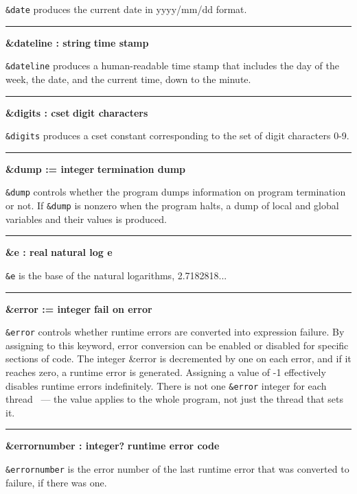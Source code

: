 \noindent
{}\texttt{\&date} produces the current
date in yyyy/mm/dd format.

\bigskip\hrule\vspace{0.1cm}
\noindent
{\bf \&dateline : string } \hfill {\bf time stamp}

\noindent
{}\texttt{\&dateline} produces a human-readable time
stamp that includes the day of the week, the date, and the current
time, down to the minute.

\bigskip\hrule\vspace{0.1cm}
\noindent
{\bf \&digits : cset } \hfill {\bf digit characters}

\noindent
{}\texttt{\&digits} produces a cset constant
corresponding to the set of digit characters 0-9.

\bigskip\hrule\vspace{0.1cm}
\noindent
{\bf \&dump := integer } \hfill {\bf termination dump}

\noindent
\texttt{\&dump} controls whether the program dumps information on
program termination or not. If \texttt{\&dump} is nonzero when the
program halts, a dump of local and global variables and their values is
produced.

\bigskip\hrule\vspace{0.1cm}
\noindent
{\bf \&e : real } \hfill {\bf natural log e}

\noindent
{}\texttt{\&e} is the base of the natural
logarithms, 2.7182818...

\bigskip\hrule\vspace{0.1cm}
\noindent
{\bf \&error := integer } \hfill {\bf fail on error}

\noindent
{}\texttt{\&error} controls whether
runtime errors are converted into expression failure. By assigning to
this keyword, error conversion can be enabled or disabled for specific
sections of code. The integer \&error is decremented by one on each
error, and if it reaches zero, a runtime error is generated. Assigning
a value of -1 effectively disables runtime errors indefinitely. 
There is not one \texttt{\&error} integer for each thread \ConcurrencyIssue\
--- the value applies to the whole program, not just the thread that sets it.

\bigskip\hrule\vspace{0.1cm}
\noindent
{\bf \&errornumber : integer? } \hfill {\bf runtime error code}

\noindent
\texttt{\&errornumber} is the error number of the last runtime error
that was converted to failure, if there was one.

